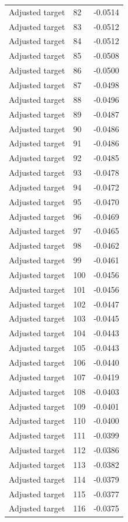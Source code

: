 \begin{table}[htbp]
\begin{tabular}{lll}
Adjusted target & 82 & -0.0514 \\
Adjusted target & 83 & -0.0512 \\
Adjusted target & 84 & -0.0512 \\
Adjusted target & 85 & -0.0508 \\
Adjusted target & 86 & -0.0500 \\
Adjusted target & 87 & -0.0498 \\
Adjusted target & 88 & -0.0496 \\
Adjusted target & 89 & -0.0487 \\
Adjusted target & 90 & -0.0486 \\
Adjusted target & 91 & -0.0486 \\
Adjusted target & 92 & -0.0485 \\
Adjusted target & 93 & -0.0478 \\
Adjusted target & 94 & -0.0472 \\
Adjusted target & 95 & -0.0470 \\
Adjusted target & 96 & -0.0469 \\
Adjusted target & 97 & -0.0465 \\
Adjusted target & 98 & -0.0462 \\
Adjusted target & 99 & -0.0461 \\
Adjusted target & 100 & -0.0456 \\
Adjusted target & 101 & -0.0456 \\
Adjusted target & 102 & -0.0447 \\
Adjusted target & 103 & -0.0445 \\
Adjusted target & 104 & -0.0443 \\
Adjusted target & 105 & -0.0443 \\
Adjusted target & 106 & -0.0440 \\
Adjusted target & 107 & -0.0419 \\
Adjusted target & 108 & -0.0403 \\
Adjusted target & 109 & -0.0401 \\
Adjusted target & 110 & -0.0400 \\
Adjusted target & 111 & -0.0399 \\
Adjusted target & 112 & -0.0386 \\
Adjusted target & 113 & -0.0382 \\
Adjusted target & 114 & -0.0379 \\
Adjusted target & 115 & -0.0377 \\
Adjusted target & 116 & -0.0375 \\

\end{tabular}
\end{table}
